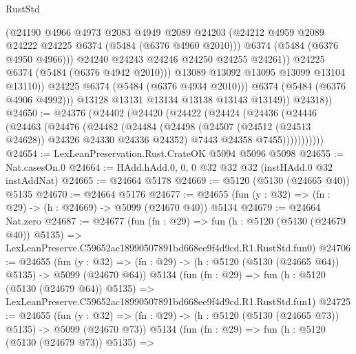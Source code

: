 \begin{lexlean}{RustStd}
\begin{coremodule}
                          (@24190
                            @4966
                            @4973
                            @2083
                            @4949
                            @2089
                            @24203
                            (@24212 @4959 @2089 @24222 @24225 @6374 (@5484 (@6376 @4960 @2010)))
                            @6374
                            (@5484 (@6376 @4950 @4966)))
                          @24240
                          @24243
                          @24246
                          @24250
                          @24255
                          @24261))
                      @24225
                      @6374
                      (@5484 (@6376 @4942 @2010)))
                    @13089
                    @13092
                    @13095
                    @13099
                    @13104
                    @13110))
                @24225
                @6374
                (@5484 (@6376 @4934 @2010)))
              @6374
              (@5484 (@6376 @4906 @4992)))
            @13128
            @13131
            @13134
            @13138
            @13143
            @13149))
        @24318))
@24650 := @24376
    (@24402
      (@24420
        (@24422
          (@24424
            (@24436
              (@24446
                (@24463
                  (@24476
                    (@24482
                      (@24484
                        (@24498
                          (@24507 (@24512 (@24513 @24628)) @24326 @24330 @24336 @24352)
                          @7443
                          @24358
                          @7455)))))))))))
@24654 := LexLeanPreservation.Rust.CrateOK @5094 @5096 @5098
@24655 := Nat.casesOn.{0}
@24664 := HAdd.hAdd.{0, 0, 0} @32 @32 @32 (instHAdd.{0} @32 instAddNat)
@24665 := @24664 @5178
@24669 := @5120 (@5130 (@24665 @40)) @5135
@24670 := @24664 @5176
@24677 := @24655 (fun (y : @32) => (fn : @29) -> (h : @24669) -> @5099 (@24670 @40)) @5134
@24679 := @24664 Nat.zero
@24687 := @24677
    (fun (fn : @29) =>
    fun (h : @5120 (@5130 (@24679 @40)) @5135) =>
    LexLeanPreserve.C59652ac18990507891bd668ee9f4d9cd.R1.RustStd.fun0)
@24706 := @24655
    (fun (y : @32) => (fn : @29) -> (h : @5120 (@5130 (@24665 @64)) @5135) -> @5099 (@24670 @64))
    @5134
    (fun (fn : @29) =>
    fun (h : @5120 (@5130 (@24679 @64)) @5135) =>
    LexLeanPreserve.C59652ac18990507891bd668ee9f4d9cd.R1.RustStd.fun1)
@24725 := @24655
    (fun (y : @32) => (fn : @29) -> (h : @5120 (@5130 (@24665 @73)) @5135) -> @5099 (@24670 @73))
    @5134
    (fun (fn : @29) =>
    fun (h : @5120 (@5130 (@24679 @73)) @5135) =>

\end{coremodule}
\end{lexlean}
